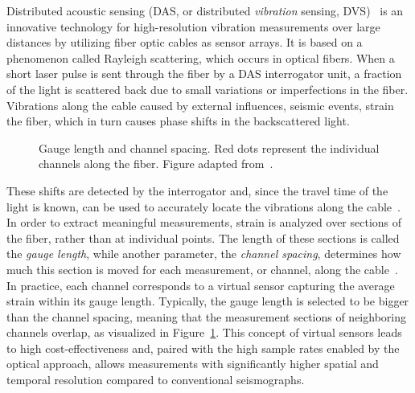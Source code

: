 Distributed acoustic sensing (DAS, or distributed \textit{vibration} sensing, DVS)~\cite{DAS} is an innovative 
technology for high-resolution vibration measurements over large distances by utilizing fiber optic cables as sensor
arrays.
It is based on a phenomenon called Rayleigh scattering, which occurs in optical fibers.
When a short laser pulse is sent through the fiber by a DAS interrogator unit, a fraction of the light is scattered back
due to small variations or imperfections in the fiber.
Vibrations along the cable caused by external influences, \eg seismic events, strain the fiber, which in turn causes
phase shifts in the backscattered light.
\begin{figure}

    \caption{
        Gauge length and channel spacing. Red dots represent the individual channels along the fiber.
        Figure adapted from~\cite{GaugeLength}.
    }
    \label{fig:gauge-length}
\end{figure}
These shifts are detected by the interrogator and, since the travel time of the light is known, can be used to
accurately locate the vibrations along the cable~\cite{DAS-N2N}.
In order to extract meaningful measurements, strain is analyzed over sections of the fiber, rather than at individual
points.
The length of these sections is called the \textit{gauge length}, while another parameter, the \textit{channel spacing},
determines how much this section is moved for each measurement, or channel, along the cable~\cite{GaugeLength}.
In practice, each channel corresponds to a virtual sensor capturing the average strain within its gauge length.
Typically, the gauge length is selected to be bigger than the channel spacing, meaning that the measurement sections
of neighboring channels overlap, as visualized in Figure~\ref{fig:gauge-length}.
This concept of virtual sensors leads to high cost-effectiveness and, paired with the high sample rates enabled by the
optical approach, allows measurements with significantly higher spatial and temporal resolution compared to
conventional seismographs.

